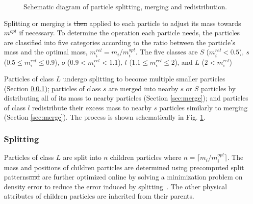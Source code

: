 \documentclass[VANCOUVER,STIX1COL]{WileyNJD-v2}
\providecommand{\DIFadd}[1]{{\protect\color{blue}\uwave{#1}}} %
\providecommand{\DIFdel}[1]{{\protect\color{red}\sout{#1}}}                      %
\providecommand{\DIFaddbegin}{} %
\providecommand{\DIFaddend}{} %
\providecommand{\DIFdelbegin}{} %
\providecommand{\DIFdelend}{} %
\begin{document}
\begin{figure}[b]
    \centering
    \vspace{-0.7\baselineskip}
    \caption{Schematic diagram of particle splitting, merging and redistribution.}
    \label{fig:split_schem}
\end{figure}

Splitting or merging is \DIFdelbegin \DIFdel{then }\DIFdelend applied to each particle to adjust its mass towards $m^{opt}$ if necessary. To determine the operation each particle needs, the particles are classified into five categories according to the ratio between the particle's mass and the optimal mass, $m_i^{rel} = m_i / m_i^{opt}$. The five classes are $S$ ($m_i^{rel} < 0.5$), $s$ ($0.5 \leq m_i^{rel} \leq 0.9$), $o$ ($0.9 < m_i^{rel} < 1.1$), $l$ ($1.1 \leq m_i^{rel} \leq 2$), and $L$ ($2 < m_i^{rel}$)

Particles of class $L$ undergo splitting to become multiple smaller particles (Section \ref{sec:split}); particles of class $s$  are merged into nearby $s$ or $S$ particles by distributing all of its mass to nearby particles (Section \ref{sec:merge}); and particles of class $l$ redistribute their excess mass to nearby $s$ particles similarly to merging (Section \ref{sec:merge}). The process is shown schematically in Fig. \ref{fig:split_schem}.

\subsubsection{Splitting}
\label{sec:split}
Particles of class $L$ are split into $n$ children particles where $n = \lceil m_i / m_i^{opt} \rceil$. The mass and positions of children particles are determined using precomputed split patterns\DIFdelbegin \DIFdel{and }\DIFdelend \DIFaddbegin \DIFadd{. They }\DIFaddend are further optimized online by solving a minimization problem on density error to reduce the error induced by splitting~\cite{Winchenbach21}. The other physical attributes of children particles are inherited from their parents.
\end{document}
